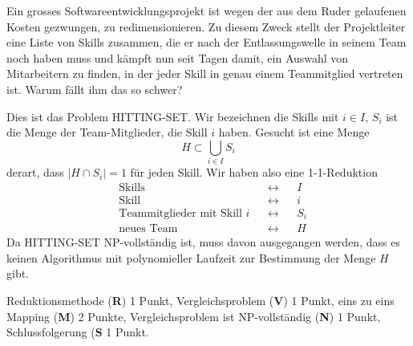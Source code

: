 Ein grosses Softwareentwicklungsprojekt ist wegen der aus dem Ruder gelaufenen
Kosten gezwungen, zu redimensionieren.
Zu diesem Zweck stellt der Projektleiter eine Liste von Skills zusammen,
die er nach der Entlassungswelle in seinem Team noch haben muss und
kämpft nun seit Tagen damit, ein Auswahl von Mitarbeitern zu finden,
in der jeder Skill in genau einem Teammitglied vertreten ist.
Warum fällt ihm das so schwer?


\begin{loesung}
Dies ist das Problem HITTING-SET.
Wir bezeichnen die Skills mit $i\in I$, $S_i$ ist die Menge der
Team-Mitglieder, die Skill $i$ haben.
Gesucht ist eine Menge
\[
H\subset \bigcup_{i\in I} S_i
\]
derart, dass $|H\cap S_i|=1$ für jeden Skill.
Wir haben also eine 1-1-Reduktion
\[
\begin{aligned}
&\text{Skills}                      &&\leftrightarrow &&I\\
&\text{Skill}                       &&\leftrightarrow &&i\\
&\text{Teammitglieder mit Skill $i$}&&\leftrightarrow &&S_i\\
&\text{neues Team}                  &&\leftrightarrow &&H
\end{aligned}
\]
Da HITTING-SET NP-vollständig ist, muss davon ausgegangen werden, dass
es keinen Algorithmus mit polynomieller Laufzeit zur Bestimmung der
Menge $H$ gibt.
\end{loesung}

\begin{bewertung}
Reduktionsmethode ({\bf R}) 1 Punkt,
Vergleichsproblem ({\bf V}) 1 Punkt,
eins zu eins Mapping ({\bf M}) 2 Punkte,
Vergleichsproblem ist NP-vollständig ({\bf N}) 1 Punkt,
Schlussfolgerung ({\bf S} 1 Punkt.
\end{bewertung}


